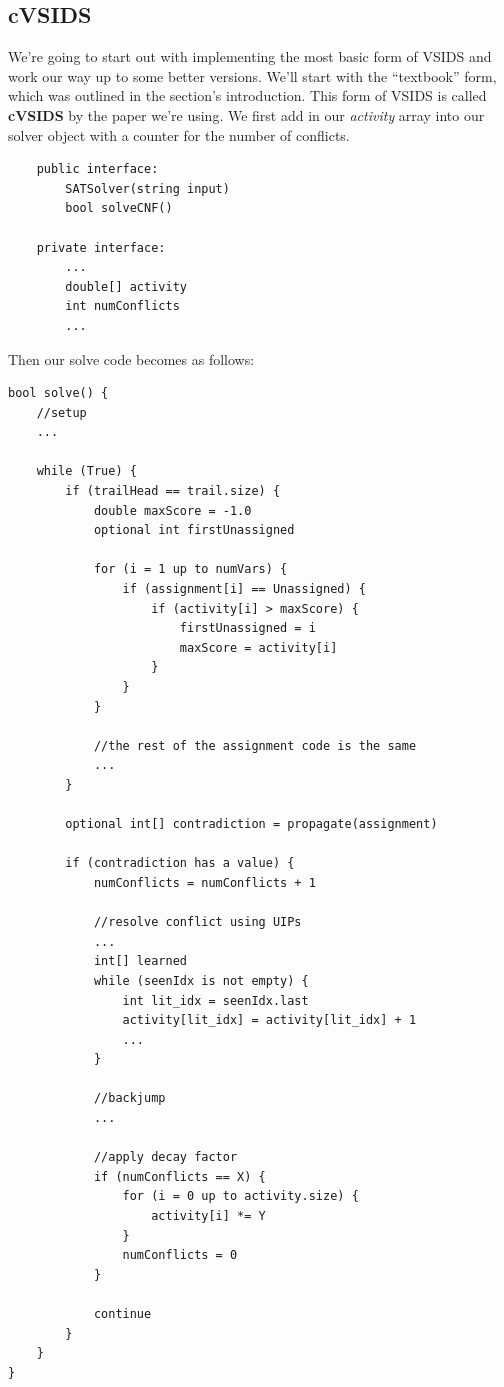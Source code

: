 \documentclass[../main.tex]{subfiles}
\begin{document}
\subsection{cVSIDS}

We're going to start out with implementing the most basic form of VSIDS and work our way 
up to some better versions. We'll start with the ``textbook'' form, which was outlined in 
the section's introduction. This form of VSIDS is called \textbf{cVSIDS} by the paper we're 
using. We first add in our \textit{activity} array into our solver 
object with a counter for the number of conflicts.
\begin{lstlisting}
    public interface:
        SATSolver(string input)
        bool solveCNF()

    private interface:
        ...
        double[] activity
        int numConflicts
        ...
\end{lstlisting}
Then our solve code becomes as follows:
\begin{lstlisting}
bool solve() {
    //setup
    ...

    while (True) {
        if (trailHead == trail.size) {
            double maxScore = -1.0
            optional int firstUnassigned

            for (i = 1 up to numVars) {
                if (assignment[i] == Unassigned) {
                    if (activity[i] > maxScore) {
                        firstUnassigned = i
                        maxScore = activity[i]
                    }
                }
            }  
            
            //the rest of the assignment code is the same
            ...
        }

        optional int[] contradiction = propagate(assignment)

        if (contradiction has a value) {
            numConflicts = numConflicts + 1

            //resolve conflict using UIPs
            ...
            int[] learned
            while (seenIdx is not empty) {
                int lit_idx = seenIdx.last
                activity[lit_idx] = activity[lit_idx] + 1
                ...
            }

            //backjump
            ...

            //apply decay factor
            if (numConflicts == X) {
                for (i = 0 up to activity.size) {
                    activity[i] *= Y
                }
                numConflicts = 0
            }

            continue
        }
    }
}
\end{lstlisting}
\end{document}
